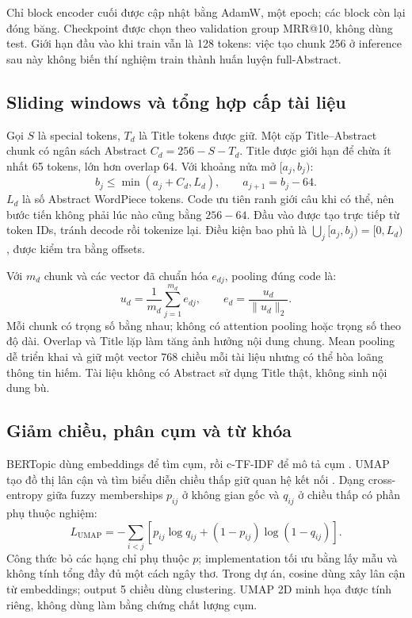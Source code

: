 Chỉ block encoder cuối được cập nhật bằng AdamW, một epoch; các block còn lại đóng băng. Checkpoint được chọn theo validation group MRR@10, không dùng test. Giới hạn đầu vào khi train vẫn là 128 tokens: việc tạo chunk 256 ở inference sau này không biến thí nghiệm train thành huấn luyện full-Abstract.

\subsection{Sliding windows và tổng hợp cấp tài liệu}
Gọi $S$ là special tokens, $T_d$ là Title tokens được giữ. Một cặp Title--Abstract chunk có ngân sách Abstract $C_d=256-S-T_d$. Title được giới hạn để chừa ít nhất 65 tokens, lớn hơn overlap 64. Với khoảng nửa mở $[a_j,b_j)$:
\begin{equation}\label{eq:windows}
b_j\le\min(a_j+C_d,L_d),\qquad a_{j+1}=b_j-64.
\end{equation}
$L_d$ là số Abstract WordPiece tokens. Code ưu tiên ranh giới câu khi có thể, nên bước tiến không phải lúc nào cũng bằng $256-64$. Đầu vào được tạo trực tiếp từ token IDs, tránh decode rồi tokenize lại. Điều kiện bao phủ là $\bigcup_j[a_j,b_j)=[0,L_d)$, được kiểm tra bằng offsets.

Với $m_d$ chunk và các vector đã chuẩn hóa $e_{dj}$, pooling đúng code là:
\begin{equation}\label{eq:pool}
u_d=\frac1{m_d}\sum_{j=1}^{m_d}e_{dj},\qquad
e_d=\frac{u_d}{\|u_d\|_2}.
\end{equation}
Mỗi chunk có trọng số bằng nhau; không có attention pooling hoặc trọng số theo độ dài. Overlap và Title lặp làm tăng ảnh hưởng nội dung chung. Mean pooling dễ triển khai và giữ một vector 768 chiều mỗi tài liệu nhưng có thể hòa loãng thông tin hiếm. Tài liệu không có Abstract sử dụng Title thật, không sinh nội dung bù.

\subsection{Giảm chiều, phân cụm và từ khóa}
BERTopic dùng embeddings để tìm cụm, rồi c-TF-IDF để mô tả cụm \cite{bertopic}. UMAP tạo đồ thị lân cận và tìm biểu diễn chiều thấp giữ quan hệ kết nối \cite{umap}. Dạng cross-entropy giữa fuzzy memberships $p_{ij}$ ở không gian gốc và $q_{ij}$ ở chiều thấp có phần phụ thuộc nghiệm:
\begin{equation}\label{eq:umap}
L_{\mathrm{UMAP}}=-\sum_{i<j}\left[p_{ij}\log q_{ij}+(1-p_{ij})\log(1-q_{ij})\right].
\end{equation}
Công thức bỏ các hạng chỉ phụ thuộc $p$; implementation tối ưu bằng lấy mẫu và không tính tổng đầy đủ một cách ngây thơ. Trong dự án, cosine dùng xây lân cận từ embeddings; output 5 chiều dùng clustering. UMAP 2D minh họa được tính riêng, không dùng làm bằng chứng chất lượng cụm.

